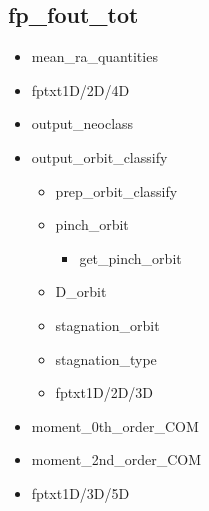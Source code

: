 \documentclass[11pt]{article}
\begin{document}
\subsection{fp\_fout\_tot}
  \begin{itemize}
  \item
    mean\_ra\_quantities
  \item
    fptxt1D/2D/4D
  \item
    output\_neoclass
  \item
    output\_orbit\_classify
    \begin{itemize}
    \item
      prep\_orbit\_classify
    \item
      pinch\_orbit
      \begin{itemize}
      \item
        get\_pinch\_orbit
      \end{itemize}
    \item
      D\_orbit
    \item
      stagnation\_orbit
    \item
      stagnation\_type
    \item
      fptxt1D/2D/3D
    \end{itemize}
  \item
    moment\_0th\_order\_COM
  \item
    moment\_2nd\_order\_COM
  \item
    fptxt1D/3D/5D
  \end{itemize}
\end{document}
